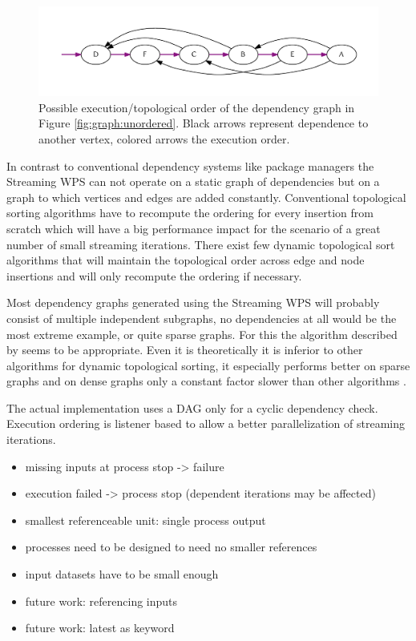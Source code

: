 		\begin{figure}[!htb]
			\centering
			\includegraphics[width=1\textwidth]{figures/ordered-graph.pdf} %
			\caption{\label{fig:graph:ordered} Possible execution/topological order of the dependency graph in Figure \ref{fig:graph:unordered}. Black arrows represent dependence to another vertex, colored arrows the execution order.}
		\end{figure}

		In contrast to conventional dependency systems like package managers the Streaming \ac{WPS} can not operate on a static graph of dependencies but on a graph to which vertices and edges are added constantly. Conventional topological sorting algorithms have to recompute the ordering for every insertion from scratch which will have a big performance impact for the scenario of a great number of small streaming iterations. There exist few dynamic topological sort algorithms that will maintain the topological order across edge and node insertions and will only recompute the ordering if necessary.

		Most dependency graphs generated using the Streaming \ac{WPS} will probably consist of multiple independent subgraphs, no dependencies at all would be the most extreme example, or quite sparse graphs. For this the algorithm described by \citet{pearce2007dynamic} seems to be appropriate. Even it is theoretically it is inferior to other algorithms for dynamic topological sorting, it especially performs better on sparse graphs and on dense graphs only a constant factor slower than other algorithms \citep{pearce2007dynamic}. %

		The actual implementation uses a \ac{DAG} only for a cyclic dependency check. Execution ordering is listener based to allow a better parallelization of streaming iterations.

		\begin{itemize}
			\item missing inputs at process stop -> failure
			\item execution failed -> process stop (dependent iterations may be affected)
			\item smallest referenceable unit: single process output
			\item processes need to be designed to need no smaller references
			\item input datasets have to be small enough
			\item future work: referencing inputs
			\item future work: latest as keyword
		\end{itemize}

